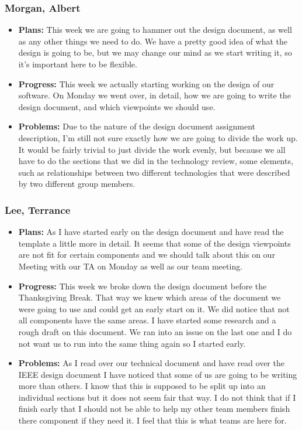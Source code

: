 \documentclass[10pt,draftclsnofoot,onecolumn]{IEEEtran}
\begin{document}
\subsubsection{Morgan, Albert}
\begin{itemize}
	\item \textbf{Plans: }
	This week we are going to hammer out the design document, as well as any other things we need to do. We have a pretty good idea of what the design is going to be, but we may change our mind as we start writing it, so it's important here to be flexible.
	\item \textbf{Progress: }
	This week we actually starting working on the design of our software. On Monday we went over, in detail, how we are going to write the design document, and which viewpoints we should use.
	\item \textbf{Problems: }
	Due to the nature of the design document assignment description, I'm still not sure exactly how we are going to divide the work up. It would be fairly trivial to just divide the work evenly, but because we all have to do the sections that we did in the technology review, some elements, such as relationships between two different technologies that were described by two different group members.
\end{itemize}
\subsubsection{Lee, Terrance}
\begin{itemize}
	\item \textbf{Plans: }As I have started early on the design document and have read the template a little more in detail. It seems that some of the design viewpoints are not fit for certain components and we should talk about this on our Meeting with our TA on Monday as well as our team meeting.
	\item \textbf{Progress: }This week we broke down the design document before the Thanksgiving Break. That way we knew which areas of the document we were going to use and could get an early start on it. We did notice that not all components have the same areas. I have started some research and a rough draft on this document. We ran into an issue on the last one and I do not want us to run into the same thing again so I started early.
	\item \textbf{Problems: }As I read over our technical document and have read over the IEEE design document I have noticed that some of us are going to be writing more than others. I know that this is supposed to be split up into an individual sections but it does not seem fair that way. I do not think that if I finish early that I should not be able to help my other team members finish there component if they need it. I feel that this is what teams are here for.
\end{itemize}
\end{document}
